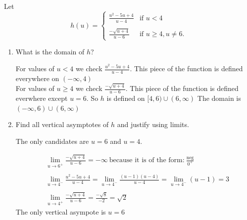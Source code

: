 \documentclass[nooutcomes]{ximera}
\begin{document}
\begin{problem}
Let 
    \[
      h(u) =
      \begin{cases}
        \frac{u^2-5u+4}{u - 4} & \mbox{if $u < 4$}\\ \\
         \frac{-\sqrt{u+4}}{u - 6} & \mbox{if $u \ge 4, u \ne 6$}.
      \end{cases}
    \]

\begin{enumerate}
	\item What is the domain of $h$?

	\begin{freeResponse}
	For values of $u<4$ we check $\frac{u^2-5u+4}{u - 4}$.  This piece of the function is defined everywhere on $(-\infty,4)$\\
	For values of $u\geq 4$ we check $\frac{-\sqrt{u+4}}{u - 6}$. This piece of the function is defined everwhere except $u=6$.  So $h$ is defined on $[4,6)\cup(6,\infty)$
	The domain is $(-\infty,6)\cup(6,\infty)$
	\end{freeResponse}

	\item Find all vertical asymptotes of $h$ and justify using limits.

	\begin{freeResponse}
	The only candidates are $u=6$ and $u=4$.
	
	\begin{align*}
	&\lim_{u \to 6^+}\frac{-\sqrt{u+4}}{u - 6}=-\infty\ \text{because it is of the form:}\ \frac{\text{neg}}{0^+}\\ \\
	&\lim_{u \to 4^-} \frac{u^2-5u+4}{u - 4}=\lim_{u \to 4^-} \frac{(u-1)(u-4)}{u - 4}=\lim_{u \to 4^-} (u-1)=3 \\ \\
	&\lim_{u \to 4^+} \frac{-\sqrt{u+4}}{u - 6}=\frac{-\sqrt{8}}{-2}=\sqrt{2}
	\end{align*}
	The only vertical asympote is $u=6$
	\end{freeResponse}
	

\end{enumerate}
\end{problem}
\end{document}
